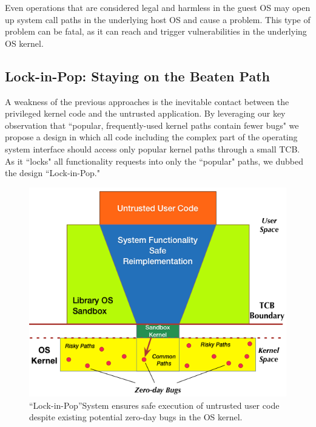 Even operations that are considered
legal and harmless in the guest OS may open up  system call paths in the underlying
host OS and cause a problem.
This type of problem can be fatal, 
as it can reach and trigger vulnerabilities in the underlying OS kernel.

\subsection{Lock-in-Pop: Staying on the Beaten Path }
A weakness of the previous approaches is the inevitable contact
between the privileged kernel code and the untrusted application. 
By leveraging our key observation 
that ``popular, frequently-used kernel paths contain fewer bugs" we propose a design
in which all code including the complex part
of the operating system interface should access only
popular kernel paths through a small TCB. As it ``locks" all functionality 
requests into only the ``popular" paths, we dubbed the
design ``Lock-in-Pop."

\begin{figure}%
\centering
\includegraphics[width=.9\columnwidth]{diagram/Virtualization_Design_Model_01.png}
\caption{\small ``Lock-in-Pop''System ensures safe execution of untrusted user code
despite existing potential zero-day bugs in the OS kernel.}
\label{fig:design_safe_reimplementation}
\end{figure}

